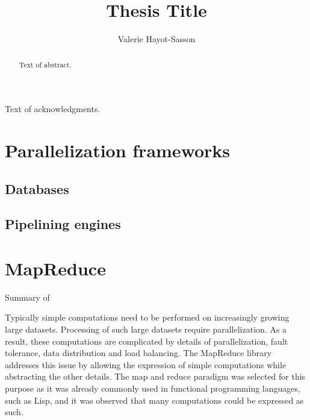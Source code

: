\documentclass{report}
\author{Valerie Hayot-Sasson}
\title{Thesis Title}
\begin{document}
\begin{abstract}
  Text of abstract.  
\end{abstract}

\begin{acknowledgments}
  Text of acknowledgments.
\end{acknowledgments}

\chapter{Parallelization frameworks}
\section{Databases}
\section{Pipelining engines}
\chapter{MapReduce}
Summary of ~\cite{mapred}

Typically simple computations need to be performed on increasingly growing large datasets. Processing of such large datasets require parallelization. As a result, these computations are complicated by details of parallelization, fault tolerance, data distribution and load balancing. The MapReduce library addresses this issue by allowing the expression of simple computations while abstracting the other details. The map and reduce paradigm was selected for this purpose as it was already commonly used in functional programming languages, such as Lisp, and it was observed that many computations could be expressed as such.
\end{document}
